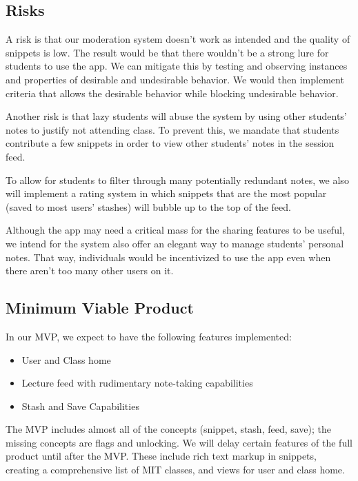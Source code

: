\documentclass{article}
\begin{document}
\newpage

\subsection*{Risks}

A risk is that our moderation system doesn't work as intended and the quality of snippets is low. The result would be that there wouldn't be a strong lure for students to use the app. We can mitigate this by testing and observing instances and properties of desirable and undesirable behavior. We would then implement criteria that allows the desirable behavior while blocking undesirable behavior.

Another risk is that lazy students will abuse the system by using other students' notes to justify not attending class. To prevent this, we mandate that students contribute a few snippets in order to view other students' notes in the session feed.

To allow for students to filter through many potentially redundant notes, we also will implement a rating system in which snippets that are the most popular (saved to most users' stashes) will bubble up to the top of the feed. 

Although the app may need a critical mass for the sharing features to be useful, we intend for the system also offer an elegant way to manage students' personal notes. That way, individuals would be incentivized to use the app even when there aren't too many other users on it. 

\subsection*{Minimum Viable Product}
In our MVP, we expect to have the following features implemented:
\begin{itemize}
\item User and Class home
\item Lecture feed with rudimentary note-taking capabilities
\item Stash and Save Capabilities
\end{itemize}

The MVP includes almost all of the concepts (snippet, stash, feed, save); the missing concepts are flags and unlocking. We will delay certain features of the full product until after the MVP. These include rich text markup in snippets, creating a comprehensive list of MIT classes, and views for user and class home.
\end{document}
